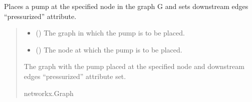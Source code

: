 \documentclass[letterpaper,10pt,english]{sphinxmanual}
\begin{document}
\begin{fulllineitems}
\label{\detokenize{pysewer:pysewer.optimization.place_pump}}
\pysigstartsignatures
{}
\pysigstopsignatures
\sphinxAtStartPar
Places a pump at the specified node in the graph G and sets downstream edges “pressurized” attribute.
\begin{quote}\begin{description}
\begin{itemize}
\item {} 
\sphinxAtStartPar
{} () \textendash{} The graph in which the pump is to be placed.

\item {} 
\sphinxAtStartPar
{} () \textendash{} The node at which the pump is to be placed.

\end{itemize}

\sphinxAtStartPar
The graph with the pump placed at the specified node and downstream edges “pressurized” attribute set.

\sphinxAtStartPar
networkx.Graph

\end{description}\end{quote}

\end{fulllineitems}

\end{document}
